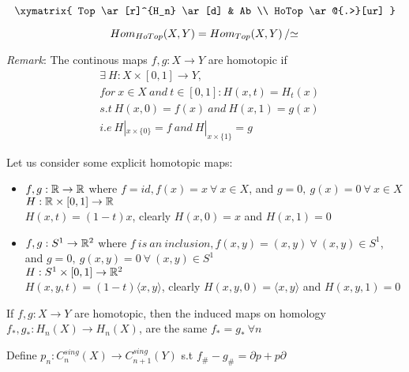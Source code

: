 \documentclass[11pt,a4paper]{report}
\begin{document}
	\[
		\xymatrix{
			Top  \ar[r]^{H_n} \ar[d] 
			& Ab  \\
			HoTop \ar@{.>}[ur] }
	\]
	
	\[ {Hom}_{HoTop}(X, Y) = {Hom}_{Top}(X, Y) \left/ \simeq \right. \]
    
    \emph{Remark}: The continous maps $f, g: X \rightarrow Y$ are homotopic if
    \begin{align*}
     &\exists \ H: X \times [0, 1] \rightarrow Y , \\
     &for \ x \in X \ and \ t \in [0, 1]: H(x, t) = H_t(x) \\
     &s.t \ H(x, 0) = f(x) \ and \ H(x, 1) = g(x) \\ 
     &i.e \ H|_{x \times \{0\}} = f \ and \ H|_{x \times \{1\}} = g 
     \end{align*}
     
     Let us consider some explicit homotopic maps: 
     
     \begin{itemize}
      \item $f, g: \mathbb{R} \rightarrow \mathbb{R}$ where $f = id, f(x) = x \ \forall \ x \in X$, and $g = 0, \ g(x) = 0 \ \forall \ x \in X$ \\
      $H: \mathbb{R} \times [0, 1] \rightarrow \mathbb{R}$ \\
      $H(x, t) = (1-t)x$, clearly $H(x, 0) = x$ and $H(x, 1) = 0$
      \item $f, g: S^1 \rightarrow \mathbb{R}^2$ where $f \ is \ an \ inclusion, f(x,y) = (x,y) \ \forall \ (x, y) \in S^1$, and $g = 0, \ g(x,y) = 0 \ \forall \ (x, y) \in S^1$ \\
      $H: S^1 \times [0, 1] \rightarrow \mathbb{R}^2$ \\
      $H(x, y, t) = (1-t)\langle x, y \rangle$, clearly $H(x, y, 0) = \langle x, y \rangle$ and $H(x, y, 1) = 0$
     \end{itemize}

     \label{homotopicSpaces}If $f, g: X \rightarrow Y$ are homotopic, then the induced maps on homology
     $f_*, g_*: H_n(X) \rightarrow H_n(X)$, are the same $f_* = g_* \ \forall{n}$
     
     Define $p_n: C_n^{sing}(X) \rightarrow C_{n+1}^{sing}(Y) $ s.t $f_\# - g_\# = \partial p + p\partial$ \\
    
\end{document}
